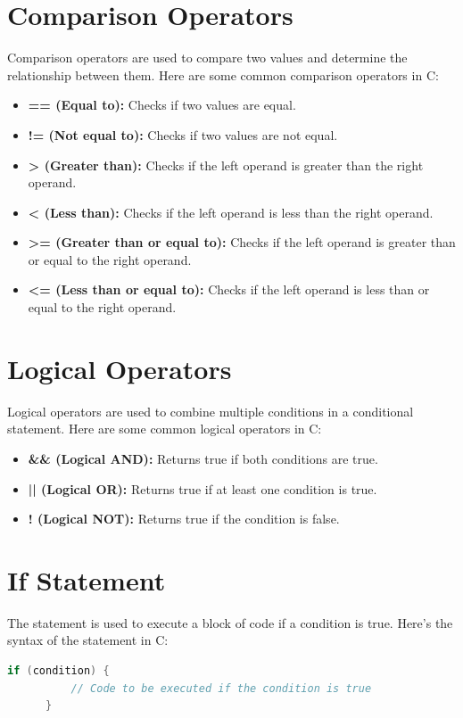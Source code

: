 \documentclass[12pt, openany]{book}
\begin{document}
  \section{Comparison Operators}
  Comparison operators are used to compare two values and determine the relationship between them. Here are some common comparison operators in C:
  \begin{itemize}
      \item \textbf{== (Equal to):} Checks if two values are equal.
      \item \textbf{!= (Not equal to):} Checks if two values are not equal.
      \item \textbf{> (Greater than):} Checks if the left operand is greater than the right operand.
      \item \textbf{< (Less than):} Checks if the left operand is less than the right operand.
      \item \textbf{>= (Greater than or equal to):} Checks if the left operand is greater than or equal to the right operand.
      \item \textbf{<= (Less than or equal to):} Checks if the left operand is less than or equal to the right operand.
  \end{itemize}
  
  \section{Logical Operators}
  Logical operators are used to combine multiple conditions in a conditional statement. Here are some common logical operators in C:
  \begin{itemize}
      \item \textbf{\&\& (Logical AND):} Returns true if both conditions are true.
      \item \textbf{|| (Logical OR):} Returns true if at least one condition is true.
      \item \textbf{! (Logical NOT):} Returns true if the condition is false.
  \end{itemize}
  
  \section{If Statement}
  The  statement is used to execute a block of code if a condition is true. Here's the syntax of the  statement in C:
  \begin{lstlisting}[language=C, caption=If Statement Syntax]
      if (condition) {
          // Code to be executed if the condition is true
      }
  \end{lstlisting}
  
\end{document}
